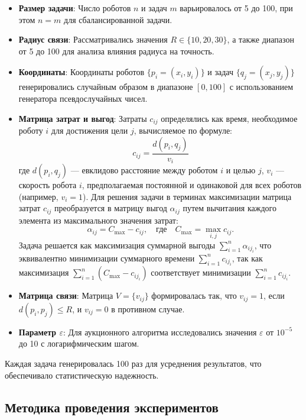 \begin{itemize}
    \item \textbf{Размер задачи}: Число роботов \( n \) и задач \( m \) варьировалось от 5 до 100, при этом \( n = m \) для сбалансированной задачи.
    \item \textbf{Радиус связи}: Рассматривались значения \( R \in \{10, 20, 30\} \), а также диапазон от 5 до 100 для анализа влияния радиуса на точность.
    \item \textbf{Координаты}: Координаты роботов \( \{p_i = (x_i, y_i)\} \) и задач \( \{q_j = (x_j, y_j)\} \) генерировались случайным образом в диапазоне \( [0, 100] \) с использованием генератора псевдослучайных чисел.
     \item \textbf{Матрица затрат и выгод}: Затраты \( c_{ij} \) определялись как время, необходимое роботу \( i \) для достижения цели \( j \), вычисляемое по формуле:
    \[
    c_{ij} = \frac{d(p_i, q_j)}{v_i}
    \]
    где \( d(p_i, q_j) \) --- евклидово расстояние между роботом \( i \) и целью \( j \), \( v_i \) --- скорость робота \( i \), предполагаемая постоянной и одинаковой для всех роботов (например, \( v_i = 1 \)). Для решения задачи в терминах максимизации матрица затрат \( c_{ij} \) преобразуется в матрицу выгод \( \alpha_{ij} \) путем вычитания каждого элемента из максимального значения затрат:
    \[
    \alpha_{ij} = C_{\text{max}} - c_{ij}, \quad \text{где} \quad C_{\text{max}} = \max_{i,j} c_{ij}.
    \]
    Задача решается как максимизация суммарной выгоды \( \sum_{i=1}^n \alpha_{i j_i} \), что эквивалентно минимизации суммарного времени \( \sum_{i=1}^n c_{i j_i} \), так как максимизация \( \sum_{i=1}^n (C_{\text{max}} - c_{i j_i}) \) соответствует минимизации \( \sum_{i=1}^n c_{i j_i} \).
    \item \textbf{Матрица связи}: Матрица \( V = \{v_{ij}\} \) формировалась так, что \( v_{ij} = 1 \), если \( d(p_i, p_j) \leq R \), и \( v_{ij} = 0 \) в противном случае.
    \item \textbf{Параметр \( \varepsilon \)}: Для аукционного алгоритма исследовались значения \( \varepsilon \) от \( 10^{-5} \) до 10 с логарифмическим шагом.
\end{itemize}

Каждая задача генерировалась 100 раз для усреднения результатов, что обеспечивало статистическую надежность.

\subsection{Методика проведения экспериментов}

